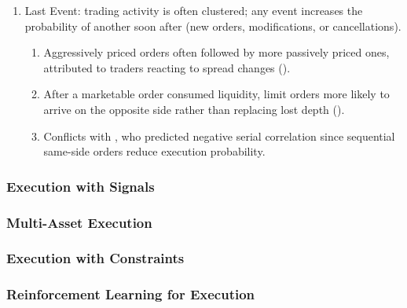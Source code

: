 \begin{remark}
\begin{enumerate}[label=\roman*.]
\begin{enumerate}[label=\arabic*.]
\item Last Event: trading activity is often clustered; any event increases the probability of another soon after (new orders, modifications, or cancellations).
\begin{enumerate}[label=\alph*.]
\setlength{\itemsep}{0pt}
\item Aggressively priced orders often followed by more passively priced ones, attributed to traders reacting to spread changes (\cite{degryse_et_al_2005}).
\item After a marketable order consumed liquidity, limit orders more likely to arrive on the opposite side rather than replacing lost depth (\cite{ellul_et_al_2003}).
\item Conflicts with \cite{parlour_1998}, who predicted negative serial correlation since sequential same-side orders reduce execution probability.
\end{enumerate}
\end{enumerate}
\end{enumerate}
\end{remark}


\subsubsection{Execution with Signals}

\subsubsection{Multi-Asset Execution}

\subsubsection{Execution with Constraints}

\subsubsection{Reinforcement Learning for Execution}
